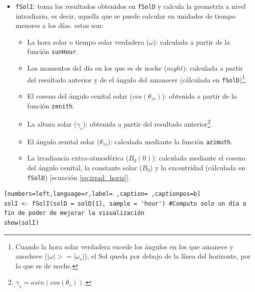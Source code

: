 \begin{itemize}
\item \texttt{fSolI}: toma los resultados obtenidos en \texttt{fSolD} y calcula la geometría a nivel intradiario, es decir, aquella que se puede calcular en unidades de tiempo menores a los días.
estas son:
\begin{itemize}
\item La hora solar o tiempo solar verdadero (\(\omega\)): calculada a partir de la función \texttt{sunHour}.
\item Los momentos del día en los que es de noche (\(night\)): calculada a partir del resultado anterior y de el ángulo del amanecer (cálculada en \texttt{fSolD})\footnote{Cuando la hora solar verdadera excede los ángulos en los que amanece y anochece (\(|\omega|>=|\omega_s|\)), el Sol queda por debajo de la línea del horizonte, por lo que es de noche.}.
\item El coseno del ángulo cenital solar (\(cos(\theta_{zs})\)): obtenida a partir de la función \texttt{zenith}.
\item La altura solar (\(\gamma_s\)): obtenida a partir del resultado anterior\footnote{\(\gamma_s=asin(cos(\theta_s))\).}.
\item El ángulo zenital solar (\(\theta_{zs}\)): calculada mediante la función \texttt{azimuth}.
\item La irradiancia extra-atmosférica (\(B_0(0)\)): calculada mediante el coseno del ángulo cenital, la constante solar (\(B_0\)) y la excentridad (cálculada en \texttt{fSolD}) [ecuación \ref{eq:irrad_horiz}].
\end{itemize}
\end{itemize}
\begin{lstlisting}[numbers=left,language=r,label= ,caption= ,captionpos=b]
solI <- fSolI(solD = solD[1], sample = 'hour') #Computo solo un día a fin de poder de mejorar la visualización
show(solI)
\end{lstlisting}

